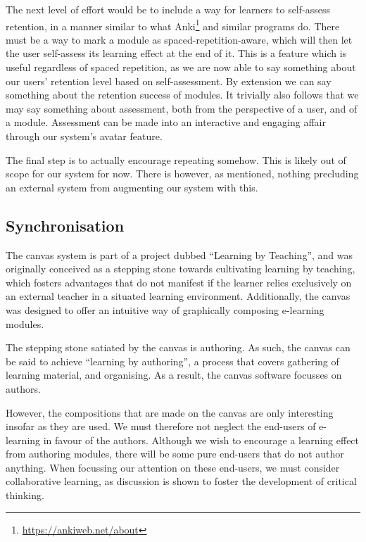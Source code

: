 \documentclass{article}
\begin{document}
\begin{multicols}{2}
The next level of effort would be to include a way for learners to self-assess 
retention, in a manner similar to what
Anki\footnote{\url{https://ankiweb.net/about}} and similar programs do. There 
must be a way to mark a module as spaced-repetition-aware, which will then let 
the user self-assess its learning effect at the end of it. This is a feature 
which is useful regardless of spaced repetition, as we are now able to say 
something about our users' retention level based on self-assessment. By 
extension we can say something about the retention success of modules. It 
trivially also follows that we may say something about assessment, both from 
the perspective of a user, and of a module. Assessment can be made into an 
interactive and engaging affair through our system's avatar 
feature\cite{berntsen2015enabling}.

The final step is to actually encourage repeating somehow. This is likely out 
of scope for our system for now. There is however, as mentioned, nothing 
precluding an external system from augmenting our system with this.
 \subsection{Synchronisation}
\label{synchronisation}
The canvas system is part of a project dubbed ``Learning by Teaching'', and 
was originally conceived as a stepping stone towards cultivating learning by 
teaching, which fosters advantages that do not manifest if the learner relies 
exclusively on an external teacher in a situated learning 
environment\cite{cortese2005learning}. Additionally, the canvas was designed 
to offer an intuitive way of graphically composing e-learning 
modules\cite{berntsen2015enabling}.

The stepping stone satiated by the canvas is authoring. As such, the canvas 
can be said to achieve ``learning by authoring'', a process that covers 
gathering of learning material, and organising. As a result, the canvas 
software focusses on authors.

However, the compositions that are made on the canvas are only interesting 
insofar as they are used. We must therefore not neglect the end-users of 
e-learning in favour of the authors. Although we wish to encourage a learning 
effect from authoring modules, there will be some pure end-users that do not 
author anything. When focussing our attention on these end-users, we must 
consider collaborative learning, as discussion is shown to foster the 
development of critical thinking\cite{gokhale1995collaborative}.


\end{multicols}
\end{document}
